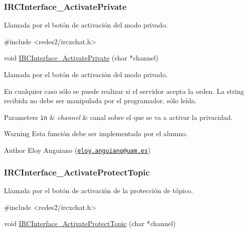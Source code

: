  \hypertarget{IRCInterface_ActivatePrivate}{}\subsubsection{I\-R\-C\-Interface\-\_\-\-Activate\-Private}\label{IRCInterface_ActivatePrivate}
Llamada por el botón de activación del modo privado.


\begin{DoxyCode}
\textcolor{preprocessor}{#include <redes2/ircxchat.h>}

\textcolor{keywordtype}{void} \hyperlink{xchat2_8c_ab1f09c737c7c109a97e22de6072d731d}{IRCInterface\_ActivatePrivate} (\textcolor{keywordtype}{char} *channel)
\end{DoxyCode}


Llamada por el botón de activación del modo privado.

En cualquier caso sólo se puede realizar si el servidor acepta la orden. La string recibida no debe ser manipulada por el programador, sólo leída.


\begin{DoxyParams}[1]{Parameters}
\mbox{\tt in}  & {\em channel} & canal sobre el que se va a activar la privacidad.\\
\hline
\end{DoxyParams}
\begin{DoxyWarning}{Warning}
Esta función debe ser implementada por el alumno.
\end{DoxyWarning}
\begin{DoxyAuthor}{Author}
Eloy Anguiano (\href{mailto:eloy.anguiano@uam.es}{\tt eloy.\-anguiano@uam.\-es})
\end{DoxyAuthor}


 \hypertarget{IRCInterface_ActivateProtectTopic}{}\subsubsection{I\-R\-C\-Interface\-\_\-\-Activate\-Protect\-Topic}\label{IRCInterface_ActivateProtectTopic}
Llamada por el botón de activación de la protección de tópico.


\begin{DoxyCode}
\textcolor{preprocessor}{#include <redes2/ircxchat.h>}

\textcolor{keywordtype}{void} \hyperlink{xchat2_8c_ac45f12d4dcacf3b5485eec6fdc51df93}{IRCInterface\_ActivateProtectTopic} (\textcolor{keywordtype}{char} *channel)
\end{DoxyCode}


